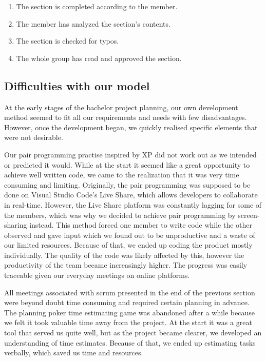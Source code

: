 \begin{enumerate}
    \item The section is completed according to the member.
    \item The member has analyzed the section's contents.
    \item The section is checked for typos.
    \item The whole group has read and approved the section.
\end{enumerate}

\subsection{Difficulties with our model}
At the early stages of the bachelor project planning, our own development method seemed to fit all our requirements and needs with few disadvantages. However, once the development began, we quickly realised specific elements that were not desirable. 

Our pair programming practise inspired by XP did not work out as we intended or predicted it would. While at the start it seemed like a great opportunity to achieve well written code, we came to the realization that it was very time consuming and limiting. Originally, the pair programming was supposed to be done on Visual Studio Code's Live Share, which allows developers to collaborate in real-time. However, the Live Share platform was constantly lagging for some of the members, which was why we decided to achieve pair programming by screen-sharing instead. This method forced one member to write code while the other observed and gave input which we found out to be unproductive and a waste of our limited resources. Because of that, we ended up coding the product mostly individually. The quality of the code was likely affected by this, however the productivity of the team became increasingly higher. The progress was easily traceable given our everyday meetings on online platforms.   

All meetings associated with scrum presented in the end of the previous section were beyond doubt time consuming and required certain planning in advance. The planning poker time estimating game was abandoned after a while because we felt it took valuable time away from the project. At the start it was a great tool that served us quite well, but as the project became clearer, we developed an understanding of time estimates. Because of that, we ended up estimating tasks verbally, which saved us time and resources.  


